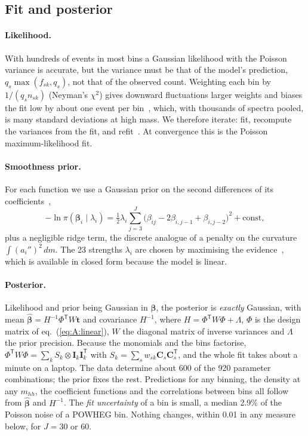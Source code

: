 \subsection{Fit and posterior}
\label{app:A:fit}

\paragraph{Likelihood.} With hundreds of events in most bins a Gaussian likelihood with the Poisson
variance is accurate, but the variance must be that of the model's prediction, $q_s\max(f_{sk}, q_s)$, not
that of the observed count. Weighting each bin by $1/(q_s n_{sk})$ (Neyman's $\chi^2$) gives downward
fluctuations larger weights and biases the fit low by about one event per bin~\cite{Baker:1983tu}, which,
with thousands of spectra pooled, is many standard deviations at high mass. We therefore iterate: fit,
recompute the variances from the fit, and refit~\cite{Green:1984}. At convergence this is the Poisson
maximum-likelihood fit.

\paragraph{Smoothness prior.} For each function we use a Gaussian prior on the second differences of its
coefficients~\cite{Eilers:1996},
\begin{equation}
  -\ln\pi(\boldsymbol\beta_i\mid\lambda_i) = \tfrac12\lambda_i\sum_{j=3}^{J}\big(\beta_{ij} - 2\beta_{i,j-1} +
  \beta_{i,j-2}\big)^2 + \text{const},
\end{equation}
plus a negligible ridge term, the discrete analogue of a penalty on the curvature $\int (a_i'')^2\,dm$. The
23 strengths $\lambda_i$ are chosen by maximising the evidence~\cite{MacKay:1992}, which is available in
closed form because the model is linear.

\paragraph{Posterior.} Likelihood and prior being Gaussian in $\boldsymbol\beta$, the posterior is
\emph{exactly} Gaussian, with mean $\hat{\boldsymbol\beta} = H^{-1}\Phi^{\mathsf T}W\boldsymbol t$ and
covariance $H^{-1}$, where $H = \Phi^{\mathsf T}W\Phi + \Lambda$, $\Phi$ is the design matrix of
eq.~(\ref{eq:A:linear}), $W$ the diagonal matrix of inverse variances and $\Lambda$ the prior precision.
Because the monomials and the bins factorise, $\Phi^{\mathsf T}W\Phi = \sum_k S_k\otimes\boldsymbol
I_k\boldsymbol I_k^{\mathsf T}$ with $S_k = \sum_s w_{sk}\boldsymbol C_s\boldsymbol C_s^{\mathsf T}$, and the
whole fit takes about a minute on a laptop. The data determine about 600 of the 920 parameter
combinations; the prior fixes the rest. Predictions for any binning, the density at any $m_{hh}$, the
coefficient functions and the correlations between bins all follow from $\hat{\boldsymbol\beta}$ and
$H^{-1}$. The \emph{fit uncertainty} of a bin is small, a median 2.9\% of the Poisson noise of a POWHEG
bin. Nothing changes, within 0.01 in any measure below, for $J = 30$ or 60.

